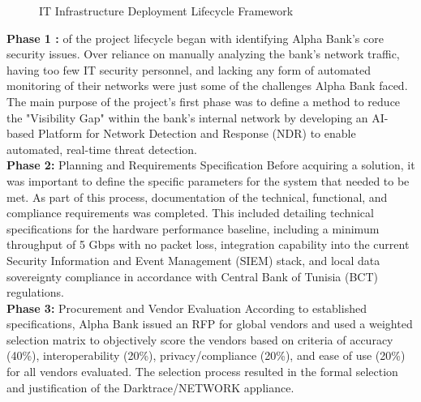 \documentclass[12pt,a4paper]{report}
\begin{document}
\begin{figure}[H]
\caption{IT Infrastructure Deployment Lifecycle Framework}
\label{fig:lifecycle}
\end{figure}







\textbf{Phase 1 :} of the project lifecycle began with identifying Alpha Bank's core security issues. Over reliance on manually analyzing the bank's network traffic, having too few IT security personnel, and lacking any form of automated monitoring of their networks were just some of the challenges Alpha Bank faced. The main purpose of the project's first phase was to define a method to reduce the "Visibility Gap" within the bank's internal network by developing an AI-based Platform for Network Detection and Response (NDR) to enable automated, real-time threat detection.\\

\textbf{Phase 2:} Planning and Requirements Specification
Before acquiring a solution, it was important to define the specific parameters for the system that needed to be met. As part of this process, documentation of the technical, functional, and compliance requirements was completed. This included detailing technical specifications for the hardware performance baseline, including a minimum throughput of 5 Gbps with no packet loss, integration capability into the current Security Information and Event Management (SIEM) stack, and local data sovereignty compliance in accordance with Central Bank of Tunisia (BCT) regulations. \\

\textbf{Phase 3:} Procurement and Vendor Evaluation 
According to established specifications, Alpha Bank issued an RFP for global vendors and used a weighted selection matrix to objectively score the vendors based on criteria of accuracy (40\%), interoperability (20\%), privacy/compliance (20\%), and ease of use (20\%) for all vendors evaluated. The selection process resulted in the formal selection and justification of the Darktrace/NETWORK appliance.\\
\end{document}
